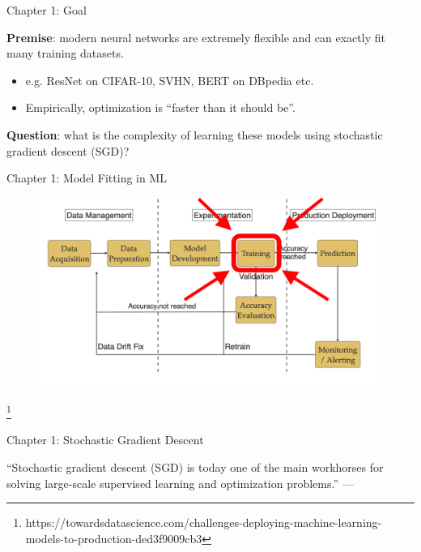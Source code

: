 \documentclass[mathserif,notheorems, hyperref={colorlinks, citecolor=blue, urlcolor=blue, linkcolor=blue}]{beamer}
\newcommand{\source}[1]{{\let\thefootnote\relax\footnote{{\tiny #1}}}}
\def\\{}%
\begin{document}
    \begin{frame}{Chapter 1: Goal}
        \Large 
        
        \textbf{Premise}: modern neural networks are extremely flexible and can exactly fit many training datasets. 
        \begin{itemize}
            \item \large e.g. ResNet on CIFAR-10, SVHN, BERT on DBpedia etc.  
            \item Empirically, optimization is ``faster than it should be''. 
        \end{itemize}        

        \vspace{4ex} 

        \textbf{Question}: what is the complexity of learning these models using stochastic gradient descent (SGD)?%
        
    \end{frame}

    \begin{frame}{Chapter 1: Model Fitting in ML}
       
       \begin{figure}
            \centering
            \includegraphics[width=0.98\textwidth]{figures/workflow_highlighted} 
       \end{figure} 

       \source{https://towardsdatascience.com/challenges-deploying-machine-learning-models-to-production-ded3f9009cb3}
    \end{frame}
    
    \begin{frame}{Chapter 1: Stochastic Gradient Descent}

        \begin{center}
            \Large
            ``Stochastic gradient descent (SGD) is today one of the main workhorses for solving large-scale supervised learning and optimization problems.''\\
            ---\citet{drori2019complexity}
        \end{center}

    \end{frame}
\end{document}
